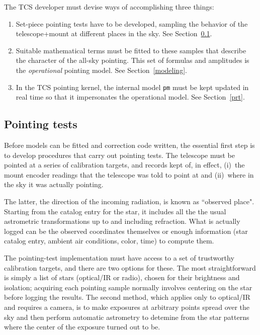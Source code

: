 \documentclass[11pt,fleqn,twoside,\paper]{article}
\renewcommand{\_}{{\tt\char'137}}     %
\begin{document}
The TCS developer must devise ways of accomplishing three things:
\begin{enumerate}
\item Set-piece pointing tests have to be developed,
      sampling the behavior of the telescope+mount at
      different places in the sky.  See Section~\ref{ptests}.
\item Suitable mathematical terms must be
      fitted to these samples that describe the character of
      the all-sky
      pointing.  This set of formulas and amplitudes
      is the {\it operational} pointing model.
      See Section~\ref{modeling}.
\item In the TCS pointing kernel, the internal
      model {\tt pm} must be kept updated in real time so that it
      impersonates the operational model.  See Section~\ref{prt}.
\end{enumerate}

\subsection{Pointing tests}
\label{ptests}

Before models can be fitted and correction code written,
the essential first step is to develop procedures
that carry out pointing tests.  The telescope must
be pointed at a series of calibration
targets, and records kept of, in effect, (i)~the mount
encoder readings that the telescope was told to point at
and (ii)~where in the sky it was actually pointing.

The latter, the direction of the incoming radiation,
is known as ``observed place".  Starting from the catalog
entry for the star, it includes all the the usual
astrometric transformations up to and including refraction.
What is actually logged can be the observed coordinates
themselves or
enough information (star catalog entry, ambient
air conditions, color, time) to compute them.

The pointing-test implementation must have access
to a set of trustworthy calibration targets, and
there are two options for these.  The most straightforward
is simply a list of stars (optical/IR or radio),
chosen for their brightness and isolation;  acquiring each
pointing sample normally involves centering on the star
before logging the results.  The second method, which
applies only to optical/IR and requires a camera, is to
make exposures at arbitrary points spread over the sky and then
perform automatic astrometry to detemine from the star patterns
where the center of the exposure turned out to be.
\end{document}
